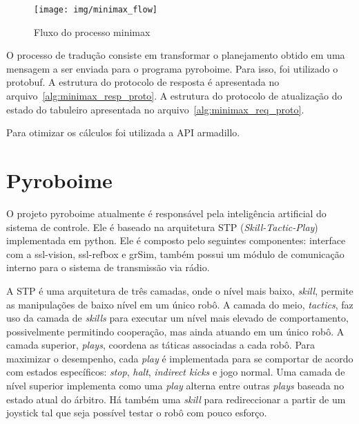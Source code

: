 \begin{figure}
  \centering
  \texttt{[image: img/minimax\_flow]}
  \caption{Fluxo do processo minimax}\label{fig:minimax_flow}
\end{figure}

O processo de tradução consiste em transformar o planejamento obtido em uma
mensagem a ser enviada para o programa pyroboime. Para isso, foi utilizado
o protobuf. A estrutura do protocolo de resposta é apresentada no
arquivo~\ref{alg:minimax_resp_proto}. A estrutura do protocolo de atualização do
estado do tabuleiro apresentada no arquivo~\ref{alg:minimax_req_proto}.

Para otimizar os cálculos foi utilizada a API armadillo.





\section{Pyroboime}\label{sec:pyroboime}

O projeto pyroboime atualmente é responsável pela inteligência artificial do
sistema de controle. Ele é baseado na arquitetura STP
(\textit{Skill-Tactic-Play}) implementada em python.
Ele é composto pelo seguintes componentes: interface com a ssl-vision,
ssl-refbox e grSim, também possui um módulo de comunicação interno para o
sistema de transmissão via rádio.

A STP é uma arquitetura de três camadas, onde o nível mais baixo, \textit{skill},
permite as manipulações de baixo nível em um único robô. A camada do meio,
\textit{tactics}, faz uso da camada de \textit{skills} para executar um nível
mais elevado de comportamento, possivelmente permitindo cooperação, mas ainda
atuando em um único robô. A camada superior, \textit{plays}, coordena as táticas
associadas a cada robô. Para maximizar o desempenho, cada \textit{play} é
implementada para se comportar de acordo com estados específicos:
\textit{stop}, \textit{halt}, \textit{indirect kicks} e jogo normal.
Uma camada de nível superior implementa como uma \textit{play} alterna entre
outras \textit{plays} baseada no estado atual do árbitro.
Há também uma \textit{skill} para redireccionar a partir de um joystick tal que
seja possível testar o robô com pouco esforço.


